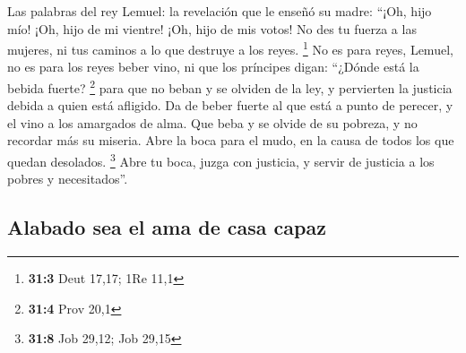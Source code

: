  Las palabras del rey Lemuel: la revelación que le enseñó
su madre:  ``¡Oh, hijo mío! ¡Oh, hijo de mi vientre! ¡Oh,
hijo de mis votos!  No des tu fuerza a las mujeres, ni tus
caminos a lo que destruye a los reyes. \footnote{\textbf{31:3} Deut
  17,17; 1Re 11,1}  No es para reyes, Lemuel, no es para
los reyes beber vino, ni que los príncipes digan: ``¿Dónde está la
bebida fuerte? \footnote{\textbf{31:4} Prov 20,1}  para
que no beban y se olviden de la ley, y pervierten la justicia debida a
quien está afligido.  Da de beber fuerte al que está a
punto de perecer, y el vino a los amargados de alma.  Que
beba y se olvide de su pobreza, y no recordar más su miseria.
 Abre la boca para el mudo, en la causa de todos los que
quedan desolados. \footnote{\textbf{31:8} Job 29,12; Job 29,15}
 Abre tu boca, juzga con justicia, y servir de justicia a
los pobres y necesitados''.

\hypertarget{alabado-sea-el-ama-de-casa-capaz}{%
\subsection{Alabado sea el ama de casa
capaz}\label{alabado-sea-el-ama-de-casa-capaz}}

